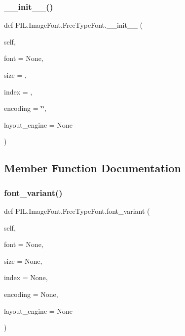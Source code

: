 \subsubsection{\texorpdfstring{\+\_\+\+\_\+init\+\_\+\+\_\+()}{\_\_init\_\_()}}
{\footnotesize\ttfamily def P\+I\+L.\+Image\+Font.\+Free\+Type\+Font.\+\_\+\+\_\+init\+\_\+\+\_\+ (\begin{DoxyParamCaption}\item[{}]{self,  }\item[{}]{font = {\ttfamily None},  }\item[{}]{size = {},  }\item[{}]{index = {},  }\item[{}]{encoding = {\ttfamily \char`\"{}\char`\"{}},  }\item[{}]{layout\+\_\+engine = {\ttfamily None} }\end{DoxyParamCaption})}



\subsection{Member Function Documentation}
\mbox{\label{classPIL_1_1ImageFont_1_1FreeTypeFont_aede98e7391dd4301211d129bdbef59ff}} 
\subsubsection{\texorpdfstring{font\+\_\+variant()}{font\_variant()}}
{\footnotesize\ttfamily def P\+I\+L.\+Image\+Font.\+Free\+Type\+Font.\+font\+\_\+variant (\begin{DoxyParamCaption}\item[{}]{self,  }\item[{}]{font = {\ttfamily None},  }\item[{}]{size = {\ttfamily None},  }\item[{}]{index = {\ttfamily None},  }\item[{}]{encoding = {\ttfamily None},  }\item[{}]{layout\+\_\+engine = {\ttfamily None} }\end{DoxyParamCaption})}

